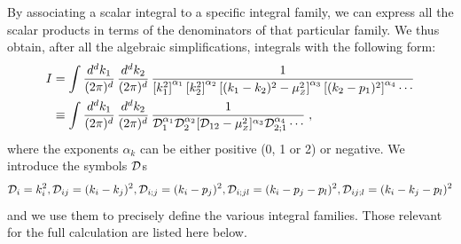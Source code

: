 \documentclass[11pt,a4paper]{article}
\begin{document}
By associating  a scalar integral to a specific integral family,
we can express all the scalar products in
terms of the denominators of that particular family.
We thus obtain, after all the algebraic simplifications, integrals with the following form:
\begin{align}
I &= \int \frac{d^dk_1}{(2\pi)^d}\,  \frac{d^dk_2}{(2\pi)^d}\,
\frac{ 1 }{
  \left[ k_1^2 \right]^{\alpha_1}
  \left[ k_2^2 \right]^{\alpha_2}
  \left[ (k_1-k_2)^2-\mu_{\scriptscriptstyle Z}^2  \right]^{\alpha_3}
  \left[ (k_2-p_1)^2 \right]^{\alpha_4}
  \cdots
}\nonumber\\
&\equiv
\int \frac{d^dk_1}{(2\pi)^d}\,  \frac{d^dk_2}{(2\pi)^d}\,
\frac{ 1 }{
{\cal D}_1^{\alpha_1}
{\cal D}_2^{\alpha_2}
[{\cal D}_{12} - \mu_{\scriptscriptstyle Z}^2 ]^{\alpha_3}
{\cal D}_{2;1}^{\alpha_4}
\cdots
  }\;,
\label{eq:exint}
\end{align}
%
where
the exponents $\alpha_k$ can be either positive (0, 1 or 2) or negative.
We introduce the symbols ${\cal D}$s
\begin{equation}
  {\cal D}_{i} = k_{i}^2, {\cal D}_{ij} = (k_i-k_j)^2,
  {\cal D}_{i;j} = (k_i-p_j)^2, {\cal D}_{i;jl} = (k_i-p_j-p_l)^2, {\cal D}_{ij;l} = (k_i-k_j-p_l)^2
\end{equation}
and we use them to precisely define the various integral families.
%
Those relevant for the full calculation are listed here below.
\end{document}
